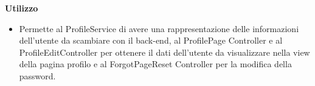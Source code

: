         \textbf{Utilizzo}  
          \begin{itemize}
            \item[] Permette al ProfileService di avere una rappresentazione delle informazioni dell'utente da scambiare con il back-end, al ProfilePage Controller e al ProfileEditController per ottenere il dati dell'utente da visualizzare nella view della pagina profilo e al ForgotPageReset Controller per la modifica della password.
          \end{itemize}